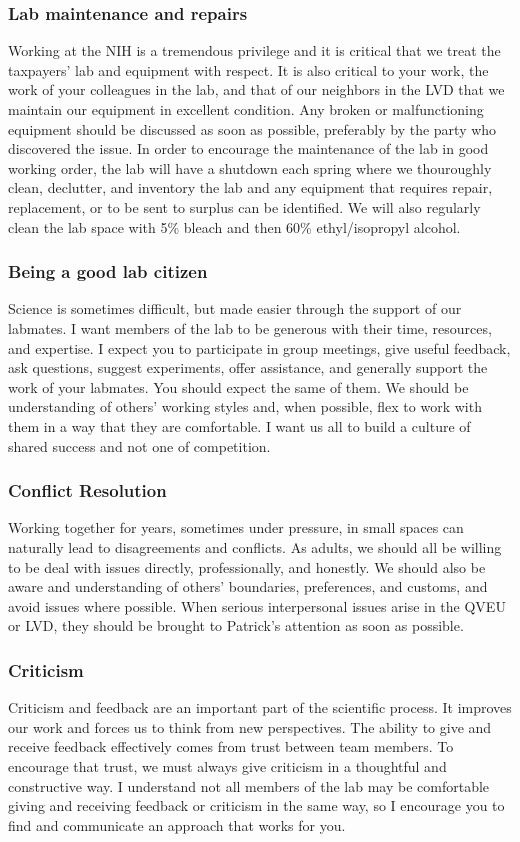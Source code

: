\documentclass[10pt, a4paper, twocolumn]{article} %
\begin{document}
\subsubsection{Lab maintenance and repairs}
Working at the NIH is a tremendous privilege and it is critical that we treat the taxpayers' lab and equipment with respect. It is also critical to your work, the work of your colleagues in the lab, and that of our neighbors in the LVD that we maintain our equipment in excellent condition. Any broken or malfunctioning equipment should be discussed as soon as possible, preferably by the party who discovered the issue.
In order to encourage the maintenance of the lab in good working order, the lab will have a shutdown each spring where we thouroughly clean, declutter, and inventory the lab and any equipment that requires repair, replacement, or to be sent to surplus can be identified. We will also regularly clean the lab space with 5\% bleach and then 60\% ethyl/isopropyl alcohol.
\subsubsection{Being a good lab citizen}
Science is sometimes difficult, but made easier through the support of our labmates. I want members of the lab to be generous with their time, resources, and expertise. I expect you to participate in group meetings, give useful feedback, ask questions, suggest experiments, offer assistance, and generally support the work of your labmates. You should expect the same of them. We should be understanding of others' working styles and, when possible, flex to work with them in a way that they are comfortable. I want us all to build a culture of shared success and not one of competition.
\subsubsection{Conflict Resolution}
Working together for years, sometimes under pressure, in small spaces can naturally lead to disagreements and conflicts. As adults, we should all be willing to be deal with issues directly, professionally, and honestly. We should also be aware and understanding of others' boundaries, preferences, and customs, and avoid issues where possible. When serious interpersonal issues arise in the QVEU or LVD, they should be brought to Patrick's attention as soon as possible.
\subsubsection{Criticism}
Criticism and feedback are an important part of the scientific process. It improves our work and forces us to think from new perspectives. The ability to give and receive feedback effectively comes from trust between team members. To encourage that trust, we must always give criticism in a thoughtful and constructive way. I understand not all members of the lab may be comfortable giving and receiving feedback or criticism in the same way, so I encourage you to find and communicate an approach that works for you.
\end{document}
